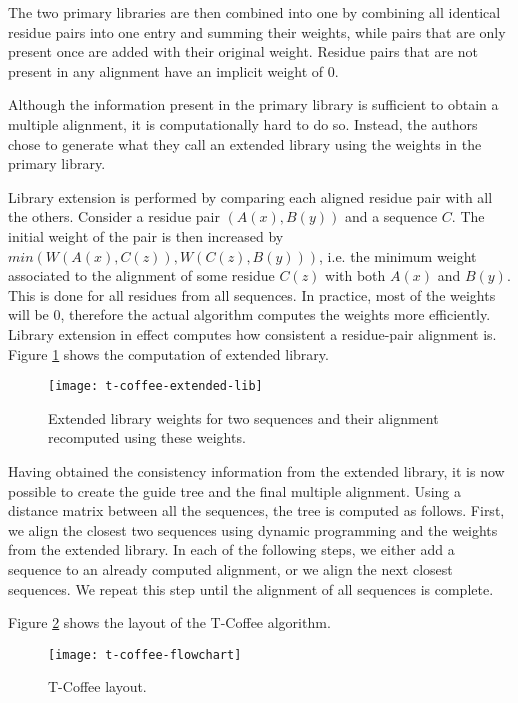 The two primary libraries are then combined into one by combining all identical residue pairs into one entry and summing their weights, while
pairs that are only present once are added with their original weight. Residue pairs that are not present in any alignment have an implicit weight
of 0.

Although the information present in the primary library is sufficient to obtain a multiple alignment, it is computationally hard to do so. Instead,
the authors chose to generate what they call an extended library using the weights in the primary library.

Library extension is performed by comparing each aligned residue pair with all the others. Consider a residue pair $(A(x), B(y))$ and a sequence $C$.
The initial weight of the pair is then increased by $min(W(A(x), C(z)), W(C(z), B(y)))$, i.e. the minimum weight associated to the alignment of some
residue $C(z)$ with both $A(x)$ and $B(y)$. This is done for all residues from all sequences. In practice, most of the weights will be 0, therefore 
the actual algorithm computes the weights more efficiently. Library extension in effect computes how consistent a residue-pair alignment is.
Figure \ref{fig:extended_lib} shows the computation of extended library.

\begin{figure}[h]
\centering
\texttt{[image: t-coffee-extended-lib]}
\caption{Extended library weights for two sequences and their alignment recomputed using these weights. \citep[Figure~2(c)]{t_coffee}}
\label{fig:extended_lib}
\end{figure}

Having obtained the consistency information from the extended library, it is now possible to create the guide tree and the final multiple alignment.
Using a distance matrix between all the sequences, the tree is computed as follows. First, we align the closest two sequences using dynamic programming
and the weights from the extended library. In each of the following steps, we either add a sequence to an already computed alignment, or we align
the next closest sequences. We repeat this step until the alignment of all sequences is complete.

Figure \ref{fig:t_coffee} shows the layout of the T-Coffee algorithm.

\begin{figure}[h]
\centering
\texttt{[image: t-coffee-flowchart]}
\caption{T-Coffee layout. \citep[Figure~1]{t_coffee}}
\label{fig:t_coffee}
\end{figure}

